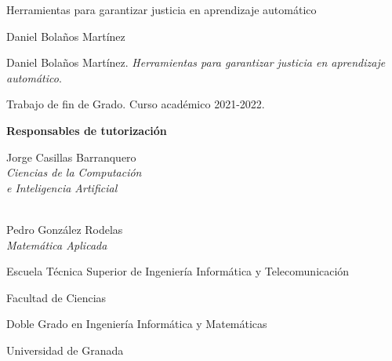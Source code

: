 

\newcommand{\miTitulo}{Herramientas para garantizar justicia en aprendizaje automático\xspace}
\newcommand{\miNombre}{Daniel Bolaños Martínez\xspace}
\newcommand{\miGrado}{Doble Grado en Ingeniería Informática y Matemáticas}
\newcommand{\miFacultadC}{Facultad de Ciencias}
\newcommand{\miFacultadI}{Escuela Técnica Superior de Ingeniería Informática y Telecomunicación}
\newcommand{\miUniversidad}{Universidad de Granada}
\newcommand{\miTutorI}{
  Jorge Casillas Barranquero \\ \emph{Ciencias de la Computación}\\ \emph{e Inteligencia Artificial} 
}
\newcommand{\miTutorC}{
  Pedro González Rodelas \\ \emph{Matemática Aplicada} 
}
\newcommand{\miCurso}{2021-2022\xspace}

\thispagestyle{empty}

\begin{center}
  \large


  \begingroup
  \huge{\miTitulo} \\ \bigskip
  \endgroup

  \textrm{\miNombre}


\end{center}

\newpage
\thispagestyle{empty}

\hfill

\vfill

\noindent\miNombre. \textit{\miTitulo}.

Trabajo de fin de Grado. Curso académico \miCurso.

\begin{minipage}[t]{0.25\textwidth}
  \flushleft
  \textbf{Responsables de tutorización}
\end{minipage}
\begin{minipage}[t]{0.45\textwidth}
  \flushleft
  \miTutorI
  \medskip \\
  \miTutorC
\end{minipage}
\begin{minipage}[t]{0.30\textwidth}
  \flushright

  \miFacultadI
  \medskip

  \miFacultadC
  \medskip \medskip
  
  \miGrado
  \medskip
  
  \miUniversidad
\end{minipage}
\begin{flushleft}
\end{flushleft}

\endinput
